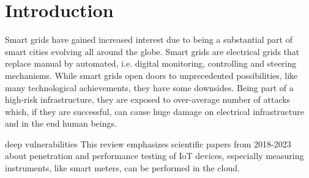 \section{Introduction}
Smart grids have gained increased interest due to being a substantial part of smart cities evolving all around the globe. Smart grids are electrical grids that replace manual by automated, i.e. digital monitoring, controlling and steering mechanisms. While smart grids open doors to unprecedented possibilities, like many technological achievements, they have some downsides. Being part of a high-risk infrastructure, they are exposed to over-average number of attacks which, if they are successful, can cause huge damage on electrical infrastructure and in the end human beings.

 deep vulnerabilities This review emphasizes scientific papers from 2018-2023 about penetration and performance testing of IoT devices, especially measuring instruments, like smart meters, can be performed in the cloud.
